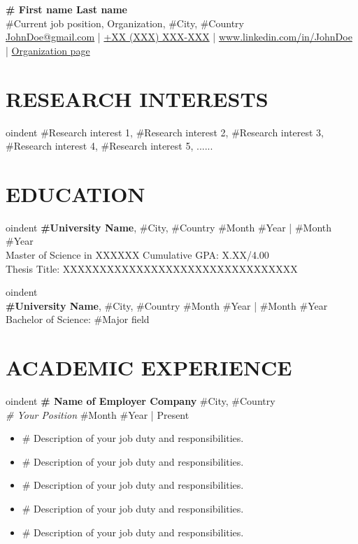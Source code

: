 \documentclass[a4paper,9pt]{extarticle}
\begin{document}
\pagestyle{fancy}
\renewcommand{\headrulewidth}{0pt}
\fancyhead{}
\thispagestyle{empty} %

\begin{flushleft}
\textbf{\LARGE \# First name Last name}\\[2pt] %
\#Current job position, Organization, \#City, \#Country
\\ \href{mailto:JohnDoe@gmail.com}{JohnDoe@gmail.com} | \href{tel:00XXXXXXXXX}{+XX (XXX) XXX-XXX} | \href{https://www.linkedin.com/in/JohnDoe}{www.linkedin.com/in/JohnDoe} | \href{https://JohnDoe/en/staff/single/59}{Organization page} %
\end{flushleft}

\section*{RESEARCH INTERESTS}

oindent
\#Research interest 1, \#Research interest 2, \#Research interest 3, \#Research interest 4, \#Research interest 5, ......
\section*{EDUCATION}

oindent
\textbf{\#University Name}, \#City, \#Country \hfill \#Month \#Year | \#Month \#Year\\ %
Master of Science in XXXXXX \hfill Cumulative GPA: X.XX/4.00 \\ %
Thesis Title: XXXXXXXXXXXXXXXXXXXXXXXXXXXXXXXX%


oindent\\
\textbf{\#University Name},  \#City, \#Country \hfill \#Month \#Year | \#Month \#Year\\ %
Bachelor of Science: \#Major field  %

\section*{ACADEMIC EXPERIENCE}

oindent
\textbf{\# Name of Employer Company} \hfill \#City, \#Country\\ %
\textit{\# Your Position} \hfill \#Month \#Year | Present %
\begin{itemize}
    \item \# Description of your job duty and responsibilities.
    \item \# Description of your job duty and responsibilities.
    \item \# Description of your job duty and responsibilities.
    \item \# Description of your job duty and responsibilities.
    \item \# Description of your job duty and responsibilities.
\end{itemize}
\end{document}
